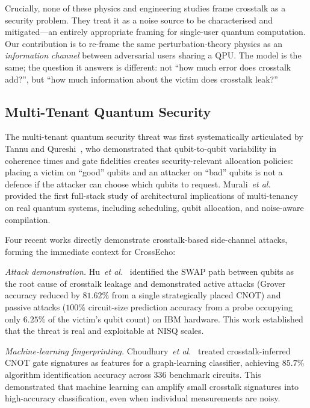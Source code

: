 \documentclass[ASNA,twocolumn]{USG}
\begin{document}
Crucially, none of these physics and engineering studies frame crosstalk as a security problem. They treat it as a noise source to be characterised and mitigated---an entirely appropriate framing for single-user quantum computation. Our contribution is to re-frame the same perturbation-theory physics as an \emph{information channel} between adversarial users sharing a QPU. The model is the same; the question it answers is different: not ``how much error does crosstalk add?'', but ``how much information about the victim does crosstalk leak?''

\subsection{Multi-Tenant Quantum Security}

The multi-tenant quantum security threat was first systematically articulated by Tannu and Qureshi~\cite{tannu2019qubits}, who demonstrated that qubit-to-qubit variability in coherence times and gate fidelities creates security-relevant allocation policies: placing a victim on ``good'' qubits and an attacker on ``bad'' qubits is not a defence if the attacker can choose which qubits to request. Murali~\emph{et al.}~\cite{murali2019fullstack} provided the first full-stack study of architectural implications of multi-tenancy on real quantum systems, including scheduling, qubit allocation, and noise-aware compilation.

Four recent works directly demonstrate crosstalk-based side-channel attacks, forming the immediate context for CrossEcho:

\textit{Attack demonstration.} Hu~\emph{et al.}~\cite{hu2025swap} identified the SWAP path between qubits as the root cause of crosstalk leakage and demonstrated active attacks (Grover accuracy reduced by $81.62\%$ from a single strategically placed CNOT) and passive attacks ($100\%$ circuit-size prediction accuracy from a probe occupying only $6.25\%$ of the victim's qubit count) on IBM hardware. This work established that the threat is real and exploitable at NISQ scales.

\textit{Machine-learning fingerprinting.} Choudhury~\emph{et al.}~\cite{choudhury2024crosstalk} treated crosstalk-inferred CNOT gate signatures as features for a graph-learning classifier, achieving $85.7\%$ algorithm identification accuracy across $336$ benchmark circuits. This demonstrated that machine learning can amplify small crosstalk signatures into high-accuracy classification, even when individual measurements are noisy.
\end{document}
